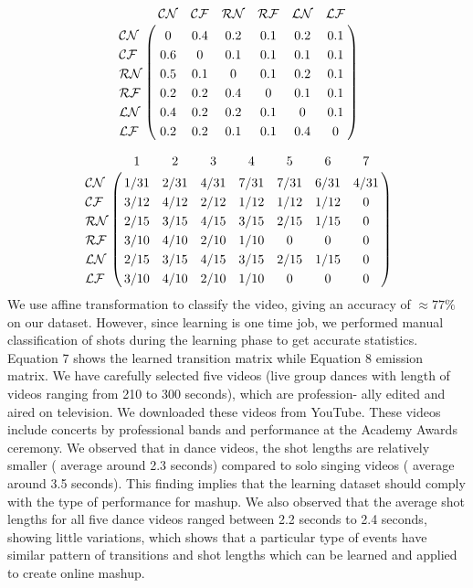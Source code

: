 \documentclass{sig-alternate}
\begin{document}
\begin{align}
                \bordermatrix{ & \text{$\mathcal{CN}$} &\text{$\mathcal{CF}$}&\text{$\mathcal{RN}$}&\text{$\mathcal{RF}$} &\text{$\mathcal{LN}$}&\text{$\mathcal{LF}$}\cr
                \text{$\mathcal{CN}$}&0 & 0.4 & 0.2 & 0.1 & 0.2 & 0.1\cr
                \text{$\mathcal{CF}$}&0.6 &0& 0.1& 0.1& 0.1& 0.1\cr
                \text{$\mathcal{RN}$}&0.5 &0.1&0& 0.1& 0.2& 0.1\cr
                \text{$\mathcal{RF}$}&0.2&0.2 &0.4&0&0.1 &0.1\cr
                \text{$\mathcal{LN}$}& 0.4 &0.2 &0.2& 0.1& 0& 0.1\cr
                \text{$\mathcal{LF}$}&0.2& 0.2& 0.1& 0.1& 0.4& 0
                }
\end{align}

\begin{align}
                \bordermatrix{ &1  &2&3&4 &5&6&7\cr
                \text{$\mathcal{CN}$}&1/31&2/31& 4/31& 7/31 &7/31& 6/31 &4/31\cr
                \text{$\mathcal{CF}$}&3/12& 4/12 &2/12& 1/12 &1/12& 1/12& 0\cr
                \text{$\mathcal{RN}$}&2/15& 3/15& 4/15& 3/15& 2/15& 1/15& 0\cr
                \text{$\mathcal{RF}$}&3/10& 4/10 &2/10& 1/10& 0 &0 &0\cr
                \text{$\mathcal{LN}$}& 2/15& 3/15 &4/15& 3/15& 2/15 &1/15& 0\cr
                \text{$\mathcal{LF}$}&3/10& 4/10 &2/10 &1/10& 0& 0& 0
                }
\end{align}
We use affine transformation to classify the video, giving an accuracy of $\approx 77\%$  on our dataset. However, since learning is one time job, we performed manual classification of shots during the learning phase to get accurate statistics. Equation 7 shows the learned transition matrix while Equation 8 emission matrix. We have carefully selected five videos (live group dances with length of videos ranging from 210 to 300 seconds), which are profession-
ally edited and aired on television. We downloaded these videos from YouTube. These videos include concerts by professional bands and performance at the Academy Awards ceremony. We observed that in dance videos, the shot lengths are relatively smaller ( average
around 2.3 seconds) compared to solo singing videos ( average around 3.5 seconds). This finding implies that the learning dataset should comply with the type of performance for mashup. We also observed that the average shot lengths for all five dance videos ranged between 2.2 seconds to 2.4 seconds, showing little variations, which shows that a particular type of events have similar pattern of transitions and shot lengths which can be learned and
applied to create online mashup.
\end{document}
